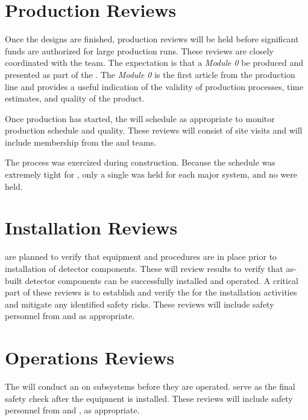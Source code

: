 \section{Production Reviews}

Once the designs are finished, production reviews will be held before
significant funds are authorized for large production runs. These
reviews are closely coordinated with the  team. The
expectation is that a \textit{Module 0} be produced and presented as
part of the . The \textit{Module 0} is the first article
from the production line and provides a useful indication of the
validity of production processes, time estimates, and quality of the
product.

Once production has started, the   will schedule  as
appropriate to monitor production schedule and quality. These reviews
will consist of site visits and will include membership from the
 and  teams.

The  process was exercized during 
construction. Because the schedule was extremely tight for
, only a single  was held for each major
system, and no  were held.


\section{Installation Reviews}

 are planned to verify that equipment and procedures are in
place prior to installation of detector components. These will
review  results to verify that as-built detector
components can be successfully installed and operated. A critical part
of these reviews is to establish and verify the  for the
installation activities and mitigate any identified safety risks.  These reviews
will include safety personnel from  and  as
appropriate.


\section{Operations Reviews}


The   will conduct an  on subsystems before they are operated.   serve as the final safety check after the 
equipment is installed. These reviews will include safety personnel from  and
, as appropriate. 

